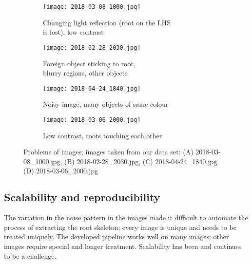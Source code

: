 \begin{figure}[H] 
	\begin{subfigure}[b]{0.5\linewidth}
		\centering
		\texttt{[image: 2018-03-08\_1000.jpg]} 
		\caption{Changing light reflection (root on the LHS\\ is lost), low contrast} 
		\label{fig7:a} 
		\vspace{4ex}
	\end{subfigure}%
	\begin{subfigure}[b]{0.5\linewidth}
		\centering
		\texttt{[image: 2018-02-28\_2030.jpg]} 
		\caption{Foreign object sticking to root, \\blurry regions, other objects} 
		\label{fig7:b} 
		\vspace{4ex}
	\end{subfigure} 
	\begin{subfigure}[b]{0.5\linewidth}
		\centering
		\texttt{[image: 2018-04-24\_1840.jpg]} 
		\caption{Noisy image, many objects of same colour} 
		\label{fig7:c} 
	\end{subfigure}%
	\begin{subfigure}[b]{0.5\linewidth}
		\centering
		\texttt{[image: 2018-03-06\_2000.jpg]} 
		\caption{Low contrast, roots touching each other} 
		\label{fig7:d} 
	\end{subfigure} 
	\caption{Problems of images; images taken from our data set: (A) 2018-03-08\_1000.jpg, (B) 2018-02-28\_2030.jpg, (C) 2018-04-24\_1840.jpg, (D) 2018-03-06\_2000.jpg}
	\label{fig7} 
\end{figure}




\subsection{Scalability and reproducibility}

The variation in the noise pattern in the images made it difficult to automate the process of extracting the root skeleton; every image is unique and needs to be treated uniquely. The developed pipeline works well on many images; other images require special and longer treatment. Scalability has been and continues to be a challenge.

